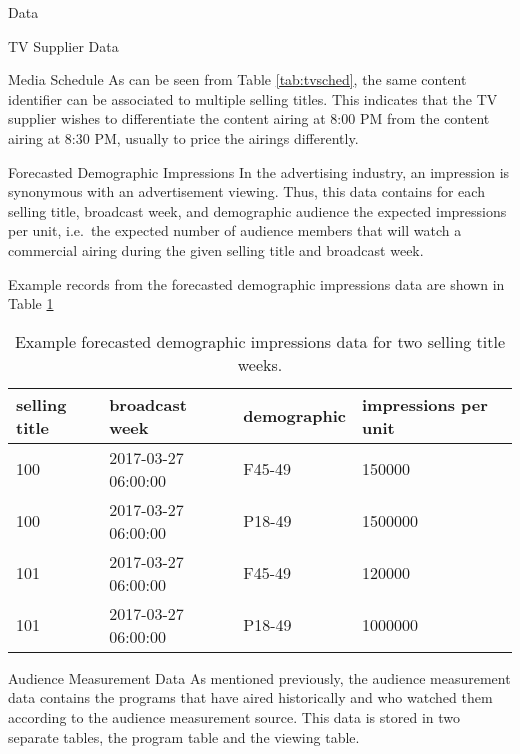 \begin{chapter}{Data}
\begin{section}{TV Supplier Data}
\begin{subsection}{Media Schedule}
    As can be seen from Table \ref{tab:tvsched}, the same content identifier can be associated
    to multiple selling titles. This indicates that the TV supplier wishes to differentiate
    the content airing at 8:00 PM from the content airing at 8:30 PM, usually to price the airings differently.

  \end{subsection}

  \begin{subsection}{Forecasted Demographic Impressions}
    In the advertising industry, an impression is synonymous with an advertisement viewing.
    Thus, this data contains for each selling title, broadcast week, and demographic audience the expected impressions per unit, i.e.\
    the expected number of audience members that will watch a commercial airing during the given selling title and broadcast week.

    Example records from the forecasted demographic impressions data are shown in Table \ref{tab:tvdem}

    \begin{table}[h!]
      \centering
        \begin{tabular}{llll}
          selling title & broadcast week & demographic & impressions per unit \\
          \hline
          100 & 2017-03-27 06:00:00 & F45-49 & 150000 \\
          100 & 2017-03-27 06:00:00 & P18-49 & 1500000 \\
          101 & 2017-03-27 06:00:00 & F45-49 & 120000 \\
          101 & 2017-03-27 06:00:00 & P18-49 & 1000000 \\
        \end{tabular}
      \caption{Example forecasted demographic impressions data for two selling title weeks.}\label{tab:tvdem}
    \end{table}
  \end{subsection}
\end{section}


\begin{section}{Audience Measurement Data}
  As mentioned previously, the audience measurement data contains the programs that
  have aired historically and who watched them according to the audience measurement source.
  This data is stored in two separate tables, the program table and the viewing table.


\end{section}
\end{chapter}
